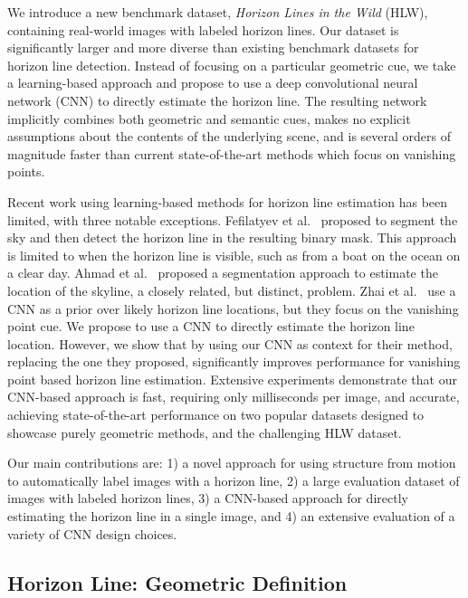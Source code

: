 \documentclass{bmvc2k}
\begin{document}
We introduce a new benchmark dataset, {\em Horizon Lines in the Wild} (HLW),
containing real-world images with labeled horizon lines. Our dataset
is significantly larger and more diverse than existing benchmark
datasets for horizon line detection.  Instead of focusing on a
particular geometric cue, we take a learning-based approach and
propose to use a deep convolutional neural network (CNN) to directly
estimate the horizon line. The resulting network implicitly combines
both geometric and semantic cues, makes no explicit assumptions about
the contents of the underlying scene, and is several orders of
magnitude faster than current state-of-the-art methods which focus on
vanishing points. 



Recent work using learning-based methods for horizon line estimation
has been limited, with three notable exceptions. Fefilatyev et
al.~\cite{fefilatyev2006horizon} proposed to segment the sky and then
detect the horizon line in the resulting binary mask. This approach is
limited to when the horizon line is visible, such as from a boat on
the ocean on a clear day. Ahmad et al.~\cite{ahmad2013machine}
proposed a segmentation approach to estimate the location of the
skyline, a closely related, but distinct, problem. Zhai et
al.~\cite{zhai2016context} use a CNN as a prior over likely
horizon line locations, but they focus on the vanishing point cue. We
propose to use a CNN to directly estimate the horizon line location.
However, we show that by using our CNN as context for their method,
replacing the one they proposed, significantly improves
performance for vanishing point based horizon line
estimation.  Extensive experiments demonstrate that our CNN-based
approach is fast, requiring only milliseconds per image, and accurate,
achieving state-of-the-art performance on two popular datasets
designed to showcase purely geometric methods, and the challenging HLW
dataset. 

Our main contributions are: 1) a novel approach for using structure
from motion to automatically label images with a horizon line, 2) a
large evaluation dataset of images with labeled horizon lines, 3) a
CNN-based approach for directly estimating the horizon line in a
single image, and 4) an extensive evaluation of a variety of CNN
design choices.

\subsection{Horizon Line: Geometric Definition}
\end{document}
